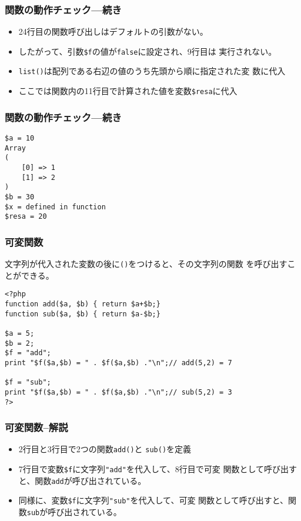 \begin{frame}[containsverbatim]
\frametitle{関数の動作チェック---続き}
\begin{itemize}
 \item 24行目の関数呼び出しはデフォルトの引数がない。
 \item したがって、引数\verb+$f+の値が\texttt{false}に設定され、9行目は
       実行されない。
 \item \texttt{list()}は配列である右辺の値のうち先頭から順に指定された変
       数に代入
 \item ここでは関数内の11行目で計算された値を変数\verb+$resa+に代入
\end{itemize}
\end{frame}
\begin{frame}[containsverbatim]
\frametitle{関数の動作チェック---続き}
\begin{verbatim}
$a = 10
Array
(
    [0] => 1
    [1] => 2
)
$b = 30
$x = defined in function
$resa = 20
\end{verbatim}
\end{frame}
 \begin{frame}[containsverbatim]
  \frametitle{可変関数}
 文字列が代入された変数の後に\texttt{()}をつけると、その文字列の関数
  を呼び出すことができる。
  {\small
\begin{verbatim}
<?php
function add($a, $b) { return $a+$b;}
function sub($a, $b) { return $a-$b;}

$a = 5;
$b = 2;
$f = "add";
print "$f($a,$b) = " . $f($a,$b) ."\n";// add(5,2) = 7

$f = "sub";
print "$f($a,$b) = " . $f($a,$b) ."\n";// sub(5,2) = 3
?>
\end{verbatim}
  }
 \end{frame}
  \begin{frame}[containsverbatim]
  \frametitle{可変関数--解説}
\begin{itemize}
\item 2行目と3行目で2つの関数\texttt{add()}と
       \texttt{sub()}を定義
 \item 7行目で変数\verb+$f+に文字列\verb+"add"+を代入して、8行目で可変
       関数として呼び出すと、関数\texttt{add}が呼び出されている。
 \item 同様に、変数\verb+$f+に文字列\verb+"sub"+を代入して、可変
       関数として呼び出すと、関数\texttt{sub}が呼び出されている。
\end{itemize}
\end{frame}






